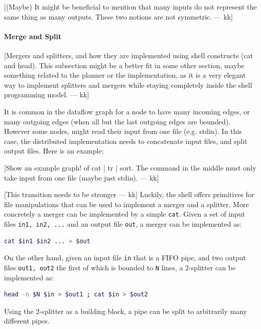 \documentclass[sigplan,10pt,review,anonymous]{acmart}
\newcommand{\kk}[1]{[{\color{magenta}#1 --- kk}]}
\begin{document}
\kk{(Maybe) It might be beneficial to mention that many inputs do not
  represent the same thing as many outputs. These two notions are not
  symmetric.}

\paragraph{Merge and Split}

\kk{Mergers and splitters, and how they are implemented using shell
  constructs (cat and head). This subsection might be a better fit in
  some other section, maybe something related to the planner or the
  implementation, as it is a very elegant way to implement splitters
  and mergers while staying completely inside the shell programming
  model.}

It is common in the dataflow graph for a node to have many incoming
edges, or many outgoing edges (when all but the last outgoing edges
are bounded). However some nodes, might read their input from one file
(e.g. stdin). In this case, the distributed implementation needs to
concatenate input files, and split output files. Here is an example:

\kk{Show an example graph! of cat | tr | sort. The command in the
  middle must only take input from one file (maybe just stdin).}

\kk{This transition needs to be stronger} Luckily, the shell offers
primitives for file manipulations that can be used to implement a
merger and a splitter. More concretely a merger can be implemented by
a simple \verb|cat|. Given a set of input files \verb|in1, in2, ...|
and an output file \verb|out|, a merger can be implemented as:

\begin{lstlisting}[language=sh, float=h, numbers=none]
 cat $in1 $in2 ... > $out
\end{lstlisting}

\noindent
On the other hand, given an input file \verb|in| that is a FIFO pipe,
and two output files \verb|out1, out2| the first of which is bounded
to \verb|N| lines, a 2-splitter can be implemented as:

\begin{lstlisting}[language=sh, float=h, numbers=none]
 head -n $N $in > $out1 ; cat $in > $out2
\end{lstlisting}

\noindent
Using the 2-splitter as a building block, a pipe can be split to
arbitrarily many different pipes.
\end{document}

